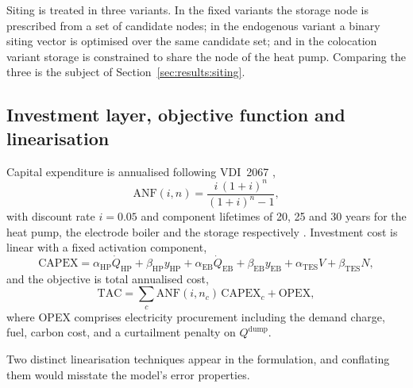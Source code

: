 \documentclass[review,3p]{elsarticle}
\newcommand{\QWP}{\dot{Q}_{\mathrm{HP}}}
\newcommand{\TAC}{\mathrm{TAC}}
\begin{document}
Siting is treated in three variants. In the fixed variants the storage
node is prescribed from a set of candidate nodes; in the endogenous
variant a binary siting vector is optimised over the same candidate set;
and in the colocation variant storage is constrained to share the node
of the heat pump. Comparing the three is the subject of
Section~\ref{sec:results:siting}.

\subsection{Investment layer, objective function and linearisation}
\label{sec:model:objective}

Capital expenditure is annualised following VDI~2067 \cite{VDI2067.2012},
\begin{equation}
\label{eq:annuity}
\mathrm{ANF}(i,n) = \frac{i\,(1+i)^{n}}{(1+i)^{n} - 1},
\end{equation}
with discount rate $i = \num{0.05}$ and component lifetimes of
\num{20}, \num{25} and \num{30} years for the heat pump, the electrode
boiler and the storage respectively \cite{DEA.2024a,DEA.2024b}.
Investment cost is linear with a
fixed activation component,
\begin{equation}
\label{eq:capex}
\mathrm{CAPEX} = \alpha_{\mathrm{HP}} \QWP + \beta_{\mathrm{HP}} y_{\mathrm{HP}}
+ \alpha_{\mathrm{EB}} \dot{Q}_{\mathrm{EB}} + \beta_{\mathrm{EB}} y_{\mathrm{EB}}
+ \alpha_{\mathrm{TES}} V + \beta_{\mathrm{TES}} N,
\end{equation}
and the objective is total annualised cost,
\begin{equation}
\label{eq:tac}
\TAC = \sum_{c} \mathrm{ANF}(i, n_c)\, \mathrm{CAPEX}_c + \mathrm{OPEX},
\end{equation}
where OPEX comprises electricity procurement including the demand
charge, fuel, carbon cost, and a curtailment penalty on
$Q^{\mathrm{dump}}$.

Two distinct linearisation techniques appear in the formulation, and
conflating them would misstate the model's error properties.
\end{document}
